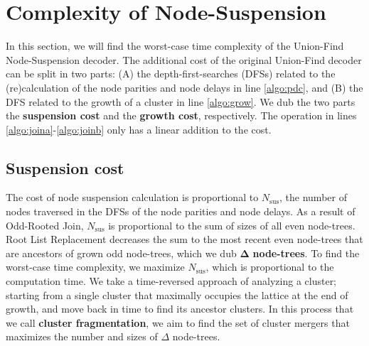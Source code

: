 
\section{Complexity of Node-Suspension}\label{sec:complexity}

In this section, we will find the worst-case time complexity of the Union-Find Node-Suspension decoder. The additional cost of the original Union-Find decoder can be split in two parts: (A) the depth-first-searches (DFSs) related to the (re)calculation of the node parities and node delays in line \ref{algo:pdc}, and (B) the DFS related to the growth of a cluster in line \ref{algo:grow}. We dub the two parts the \textbf{suspension cost} and the \textbf{growth cost}, respectively. The  operation in lines \ref{algo:joina}-\ref{algo:joinb} only has a linear addition to the cost.

\subsection{Suspension cost}\label{sec:suscomplexity}

The cost of node suspension calculation is proportional to $N_{\text{sus}}$, the number of nodes traversed in the DFSs of the node parities and node delays. As a result of Odd-Rooted Join, $N_{\text{sus}}$ is proportional to the sum of sizes of all even node-trees. Root List Replacement decreases the sum to the most recent even node-trees that are ancestors of grown odd node-trees, which we dub $\mathbf{\Delta}$ \textbf{node-trees}. To find the worst-case time complexity, we maximize $N_{\text{sus}}$, which is proportional to the computation time. We take a time-reversed approach of analyzing a cluster; starting from a single cluster that maximally occupies the lattice at the end of growth, and move back in time to find its ancestor clusters. In this process that we call \textbf{cluster fragmentation}, we aim to find the set of cluster mergers that maximizes the number and sizes of $\Delta$ node-trees. 




